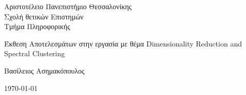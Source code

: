 \begin{titlepage}
	\afterpage{\blankpage}	
	\begin{figure}[H]
		\begin{center}
			\label{fig:cover_auth_logo}
		\end{center}
	\end{figure}
	
	\centering
	\Large Αριστοτέλειο Πανεπιστήμιο Θεσσαλονίκης\\
	\Large Σχολή θετικών Επιστημών\\
	\large Τμήμα Πληροφορικής\\
	
	
	\vspace{\fill}
	
	\LARGE Έκθεση Αποτελεσμάτων στην εργασία με θέμα Dimensionality Reduction and Spectral Clustering
	
	\vspace{\fill}
	
	Βασίλειος Ασημακόπουλος
	
	
	
	\centering
	
	\today
	
\end{titlepage}






